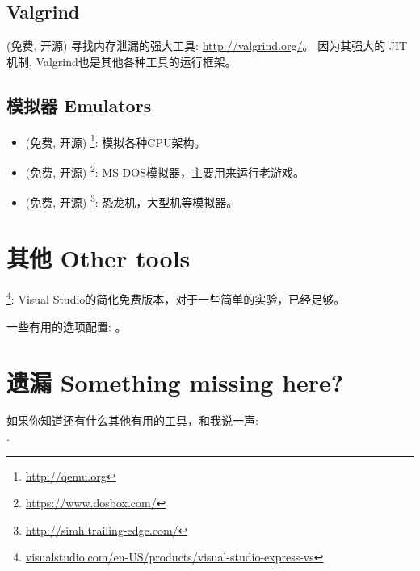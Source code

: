 \documentclass[UTF8,nofonts]{ctexart}
\begin{document}
\subsection{Valgrind}

(免费, 开源) 寻找内存泄漏的强大工具: \url{http://valgrind.org/}。
因为其强大的 \ac{JIT} 机制, Valgrind也是其他各种工具的运行框架。


\subsection{模拟器 Emulators}

\begin{itemize}
\item (免费, 开源) \footnote{\url{http://qemu.org}}: 模拟各种CPU架构。

\item (免费, 开源) \footnote{\url{https://www.dosbox.com/}}: MS-DOS模拟器，主要用来运行老游戏。 

\item (免费, 开源) \footnote{\url{http://simh.trailing-edge.com/}}: 恐龙机，大型机等模拟器。
\end{itemize}

\section{其他 Other tools}

\footnote{\href{http://go.yurichev.com/17034}{visualstudio.com/en-US/products/visual-studio-express-vs}}:
Visual Studio的简化免费版本，对于一些简单的实验，已经足够。

一些有用的选项配置: 。

\section{遗漏 Something missing here?}

如果你知道还有什么其他有用的工具，和我说一声:\\
\TT{\EMAIL}.
\end{document}
